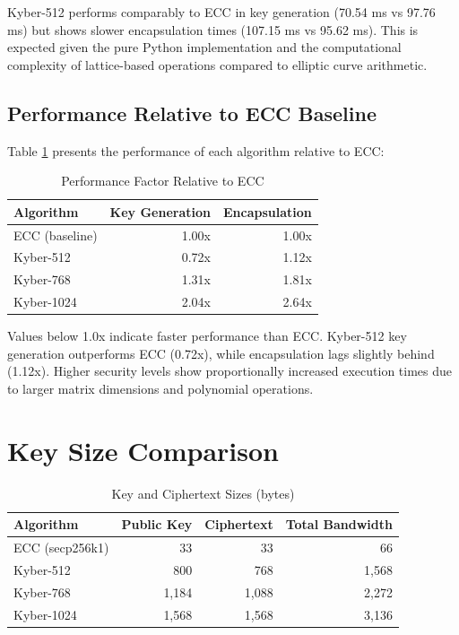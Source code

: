 Kyber-512 performs comparably to ECC in key generation (70.54 ms vs 97.76 ms) but shows slower encapsulation times (107.15 ms vs 95.62 ms). This is expected given the pure Python implementation and the computational complexity of lattice-based operations compared to elliptic curve arithmetic.

\subsection{Performance Relative to ECC Baseline}

Table \ref{tab:slowdown} presents the performance of each algorithm relative to ECC:

\begin{table}[!htbp]
\centering
\caption{\label{tab:slowdown}Performance Factor Relative to ECC}
\begin{tabular}{l|r|r}
\hline
\textbf{Algorithm} & \textbf{Key Generation} & \textbf{Encapsulation} \\ \hline
ECC (baseline) & 1.00x & 1.00x \\
Kyber-512 & 0.72x & 1.12x \\
Kyber-768 & 1.31x & 1.81x \\
Kyber-1024 & 2.04x & 2.64x \\ \hline
\end{tabular}
\end{table}

Values below 1.0x indicate faster performance than ECC. Kyber-512 key generation outperforms ECC (0.72x), while encapsulation lags slightly behind (1.12x). Higher security levels show proportionally increased execution times due to larger matrix dimensions and polynomial operations.

\section{Key Size Comparison}

\begin{table}[!htbp]
\centering
\caption{\label{tab:keysize}Key and Ciphertext Sizes (bytes)}
\begin{tabular}{l|r|r|r}
\hline
\textbf{Algorithm} & \textbf{Public Key} & \textbf{Ciphertext} & \textbf{Total Bandwidth} \\ \hline
ECC (secp256k1) & 33 & 33 & 66 \\
Kyber-512 & 800 & 768 & 1,568 \\
Kyber-768 & 1,184 & 1,088 & 2,272 \\
Kyber-1024 & 1,568 & 1,568 & 3,136 \\ \hline
\end{tabular}
\end{table}

